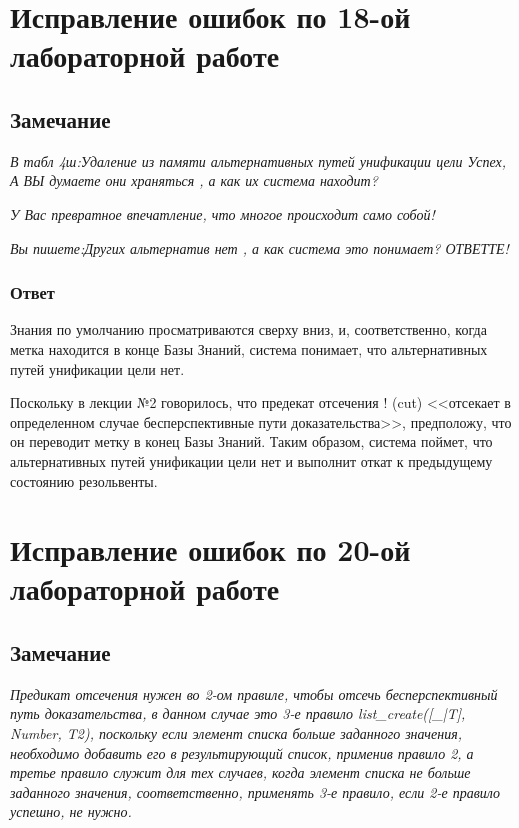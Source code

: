 \documentclass[a4paper,12pt]{article}
\begin{document}
	\section*{Исправление ошибок по 18-ой лабораторной работе}
	
	\subsection*{Замечание}
	
	\textit{В табл 4ш:Удаление из памяти альтернативных путей унификации цели Успех, А ВЫ думаете они храняться , а как их система находит?}
	
	\textit{У Вас превратное впечатление, что многое происходит само собой!} 
	
	\textit{Вы пишете:Других альтернатив нет , а как  система это понимает?        ОТВЕТТЕ!}
	
	\subsubsection*{Ответ}
	
	Знания по умолчанию просматриваются сверху вниз, и, соответственно, когда метка находится в конце Базы Знаний, система понимает, что альтернативных путей унификации цели нет.
	
	Поскольку в лекции №2 говорилось, что предекат отсечения ! (cut) <<отсекает в определенном случае бесперспективные пути доказательства>>, предположу, что он переводит метку в конец Базы Знаний. Таким образом, система поймет, что альтернативных путей унификации цели нет и выполнит откат к предыдущему состоянию резольвенты.
	
	
	\section*{Исправление ошибок по 20-ой лабораторной работе}
	
	\subsection*{Замечание}
	
	\textit{Предикат отсечения нужен во 2-ом правиле, чтобы отсечь бесперспективный путь доказательства, в данном случае это 3-е правило list\_create([\_|T], Number, T2), поскольку если элемент списка больше заданного значения, необходимо добавить его в результирующий список, применив правило 2, а третье правило служит для тех случаев, когда элемент списка не больше заданного значения, соответственно, применять 3-е правило, если 2-е правило успешно, не нужно.}
	
\end{document}
